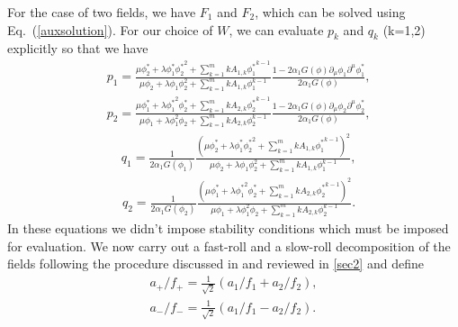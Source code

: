 \documentclass[a4paper,11pt]{article}
\def\non{\nonumber\\}
\def\non{\nonumber\\}
\begin{document}
  For the case of two fields, we have $F_1$ and $F_2$, which can be solved using Eq.~(\ref{auxsolution}).
  For our choice of $W$, we can evaluate $p_k$ and $q_k$ (k=1,2) explicitly so that we have
  \begin{equation} \label{DisplayFormulaNumbered:eq.twoDBI.p.1}
  \begin{split}
    & p_1
    =\frac{\mu \phi^*_2+\lambda \phi^*_1{\phi^*_2}^2+\sum_{k=1}^mk A_{1, k}{\phi^*_1}^{k-1}}{\mu \phi_2+\lambda \phi_1\phi_2^2+\sum_{k=1}^mk A_{1, k}\phi_1^{k-1}}\frac{1-2\alpha_1G\left(\phi\right)\partial_\mu \phi_1\partial^\mu \phi^*_1}{2\alpha_1G\left(\phi\right)},
  \end{split}
  \end{equation}
  \begin{equation} \label{DisplayFormulaNumbered:eq.twoDBI.p.2}
  \begin{split}
    & p_2
    =\frac{\mu \phi^*_1+\lambda {\phi^*_1}^2 \phi^*_2 + \sum_{k=1}^mk A_{2, k}{\phi^*_2}^{k-1}}{\mu \phi_1+\lambda \phi_1^2\phi_2+\sum_{k=1}^mk A_{2, k}\phi_2^{k-1}}\frac{1-2\alpha_1G\left(\phi\right)\partial_\mu \phi_2\partial^\mu \phi^*_2}{2\alpha_1G\left(\phi\right)},
  \end{split}
  \end{equation}
  \begin{equation} \label{DisplayFormulaNumbered:eq.twoDBI.q.1}
  \begin{split}
    & q_1
    =\frac{1}{2\alpha_1G\left(\phi_1\right)}\frac{{\left(\mu \phi^*_2 + \lambda \phi^*_1 {\phi^*_2}^2+\sum_{k=1}^mk A_{1, k}{\phi^*_1}^{k-1}\right)}^2}{\mu \phi_2+\lambda \phi_1\phi_2^2 + \sum_{k=1}^mk A_{1, k}\phi_1^{k-1}},
  \end{split}
  \end{equation}
  \begin{equation} \label{DisplayFormulaNumbered:eq.twoDBI.q.2}
  \begin{split}
    & q_2
    =\frac{1}{2\alpha_1G\left(\phi_2\right)}\frac{{\left(\mu \phi^*_1 + \lambda {\phi^*_1}^2 \phi^*_2 + \sum_{k=1}^mk A_{2, k}{\phi^*_2}^{k-1}\right)}^2}{\mu \phi_1+\lambda \phi_1^2\phi_2 + \sum_{k=1}^mk A_{2, k}\phi_2^{k-1}}.
  \end{split}
  \end{equation}
  In these equations we didn't impose stability conditions which must be imposed for evaluation.
  We now carry out a fast-roll and a slow-roll decomposition of the fields following the procedure discussed in \cite{Nath:2017ihp} and reviewed in \ref{sec2} and define
  \begin{align} \label{eq.twoDBI.aPlusMinusFull}
    a_+/f_+={\frac{1}{\sqrt 2}}\left(a_1/f_1+a_2/f_2\right),\non
    a_-/f_-={\frac{1}{\sqrt 2}}\left(a_1/f_1-a_2/f_2\right).
  \end{align}
\end{document}
